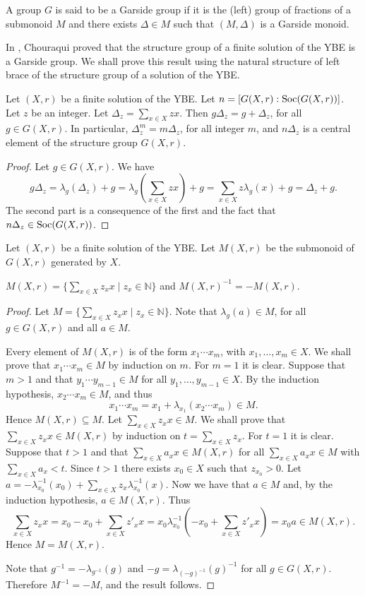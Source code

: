 \begin{definition} A group $G$ is said to be a Garside group if it is the
(left) group of fractions of a submonoid $M$ and there exists
$\Delta\in M$ such that $(M,\Delta)$ is a Garside monoid.
\end{definition}

In \cite[Theorem~3.3]{MR2764830}, Chouraqui proved that the structure
group of a finite solution of the YBE is a Garside group. We shall
prove this result using the natural structure of left brace of the
structure group of a solution of the YBE.

\begin{lemma}\label{gar1} Let $(X,r)$ be a finite solution of the YBE. Let
$n=[G(X,r):\operatorname{Soc}(G(X,r))]$. Let $z$ be an integer. Let
$\Delta_z=\sum_{x\in X}zx$. Then $g\Delta_z=g+\Delta_z$, for all
$g\in G(X,r)$. In particular, $\Delta_z^m=m\Delta_z$, for all
integer $m$, and $n\Delta_z$ is a central element of the structure
group $G(X,r)$.
\end{lemma}

\begin{proof} Let $g\in G(X,r)$. We have
$$g\Delta_z=\lambda_g(\Delta_z)+g=\lambda_g(\sum_{x\in X}zx)+g=\sum_{x\in X}z\lambda_g(x)+g=\Delta_z+g.$$
The second part is a consequence of the first and the fact that
$n\Delta_z\in \operatorname{Soc}(G(X,r))$.
\end{proof}

Let $(X,r)$ be a finite solution of the YBE. Let $M(X,r)$ be the
submonoid of $G(X,r)$ generated by $X$.

\begin{lemma}\label{gar2} $M(X,r)=\{ \sum_{x\in X}z_xx\mid z_x\in
\mathbb{N}\}$ and $M(X,r)^{-1}=-M(X,r)$.
\end{lemma}

\begin{proof} Let $M=\{ \sum_{x\in X}z_xx\mid z_x\in \mathbb{N}\}$.
Note that $\lambda_g(a)\in M$, for all $g\in G(X,r)$ and all $a\in
M$.

Every element of $M(X,r)$ is of the form $x_1\cdots x_m$, with $x_1,
\dots ,x_m\in X$. We shall prove that $x_1\cdots x_m\in M$ by
induction on $m$. For $m=1$ it is clear. Suppose that $m>1$ and that
$y_1\cdots y_{m-1}\in M$ for all $y_1,\dots,y_{m-1}\in X$. By the
induction hypothesis, $x_2\cdots x_m\in M$, and thus
$$x_1\cdots x_m=x_1+\lambda_{x_1}(x_2\cdots x_m)\in M.$$
Hence $M(X,r)\subseteq M$. Let $\sum_{x\in X}z_xx\in M$. We shall
prove that $\sum_{x\in X}z_xx\in M(X,r)$ by induction on
$t=\sum_{x\in X}z_x$. For $t=1$ it is clear. Suppose that $t>1$ and
that $\sum_{x\in X}a_xx\in M(X,r)$ for all $\sum_{x\in X}a_xx\in M$
with $\sum_{x\in X}a_x<t$. Since $t>1$ there exists $x_0\in X$ such
that $z_{x_0}>0$. Let $a=-\lambda^{-1}_{x_0}(x_0)+\sum_{x\in
X}z_x\lambda^{-1}_{x_0}(x)$. Now we have that $a\in M$ and, by the
induction hypothesis, $a\in M(X,r)$. Thus
$$\sum_{x\in X}z_xx=x_0-x_0+\sum_{x\in X}z'_xx=x_0\lambda^{-1}_{x_0}(-x_0+\sum_{x\in X}z'_xx)=x_0a\in M(X,r).$$
Hence $M=M(X,r)$.

Note that $g^{-1}=-\lambda_{g^{-1}}(g)$ and
$-g=\lambda_{(-g)^{-1}}(g)^{-1}$ for all $g\in G(X,r)$. Therefore
$M^{-1}=-M$, and the result follows.
\end{proof}

